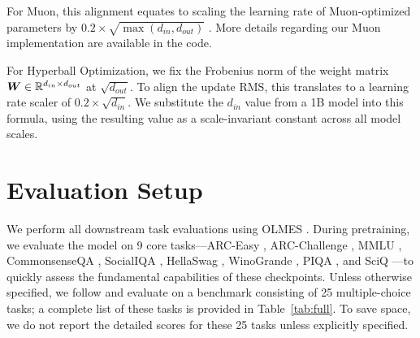 \documentclass[11pt]{article}
\begin{document}
For Muon, this alignment equates to scaling the learning rate of Muon-optimized parameters by $0.2 \times \sqrt{\max(d_{in}, d_{out})}$ \cite{k2}. 
More details regarding our Muon implementation are available in the code.

For Hyperball Optimization, we fix the Frobenius norm of the weight matrix ${\bm{W}} \in \mathbb{R}^{d_{in} \times d_{out}}$ at $\sqrt{d_{out}}$. 
To align the update RMS, this translates to a learning rate scaler of $0.2 \times \sqrt{d_{in}}$. 
We substitute the $d_{in}$ value from a 1B model into this formula, using the resulting value as a scale-invariant constant across all model scales.

\section{Evaluation Setup}
\label{apx:eval}
We perform all downstream task evaluations using OLMES \citep{olmes}. During pretraining, we evaluate the model on 9 core tasks—ARC-Easy \cite{arc}, ARC-Challenge \cite{arc}, MMLU \cite{mmlu}, CommonsenseQA \cite{csqa}, SocialIQA \cite{siqa}, HellaSwag \cite{hella}, WinoGrande \cite{wino}, PIQA \cite{piqa}, and SciQ \cite{sciq}—to quickly assess the fundamental capabilities of these checkpoints. Unless otherwise specified, we follow \cite{olmo3} and evaluate on a benchmark consisting of 25 multiple-choice tasks; a complete list of these tasks is provided in Table~\ref{tab:full}. To save space, we do not report the detailed scores for these 25 tasks unless explicitly specified.

\begin{table}[h]
  \centering
  \small

  \caption{Pretraining hyperparameters (1B AdamW).}
  \label{tab:pthyper_1b}
\end{table}
\end{document}
